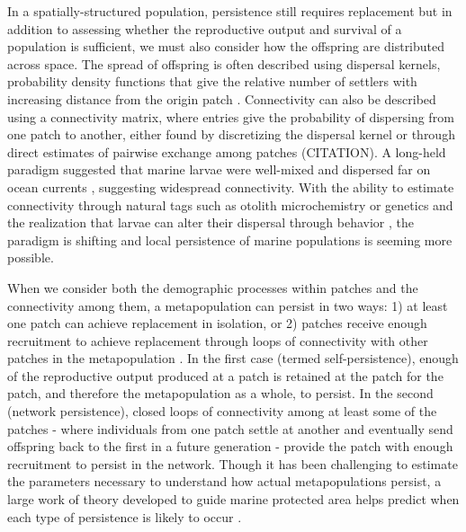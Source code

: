 \documentclass[12pt, oneside]{article}   	%
\begin{document}
In a spatially-structured population, persistence still requires replacement but in addition to assessing whether the reproductive output and survival of a population is sufficient, we must also consider how the offspring are distributed across space. The spread of offspring is often described using dispersal kernels, probability density functions that give the relative number of settlers with increasing distance from the origin patch \citep[e.g.][]{bode2018estimating}. Connectivity can also be described using a connectivity matrix, where entries give the probability of dispersing from one patch to another, either found by discretizing the dispersal kernel or through direct estimates of pairwise exchange among patches (CITATION). A long-held paradigm suggested that marine larvae were well-mixed and dispersed far on ocean currents \citep{roughgarden_recruitment_1988}, suggesting widespread connectivity. With the ability to estimate connectivity through natural tags such as otolith microchemistry or genetics and the realization that larvae can alter their dispersal through behavior \citep[e.g.][]{morgan_nearshore_2009}, the paradigm is shifting and local persistence of marine populations is seeming more possible. %

When we consider both the demographic processes within patches and the connectivity among them, a metapopulation can persist in two ways: 1) at least one patch can achieve replacement in isolation, or 2) patches receive enough recruitment to achieve replacement through loops of connectivity with other patches in the metapopulation \citep{hastings_persistence_2006, burgess2014beyond}. In the first case (termed self-persistence), enough of the reproductive output produced at a patch is retained at the patch for the patch, and therefore the metapopulation as a whole, to persist. In the second (network persistence), closed loops of connectivity among at least some of the patches - where individuals from one patch settle at another and eventually send offspring back to the first in a future generation - provide the patch with enough recruitment to persist in the network. Though it has been challenging to estimate the parameters necessary to understand how actual metapopulations persist, a large work of theory developed to guide marine protected area helps predict when each type of persistence is likely to occur \citep[i.e.\ large patches relative to the mean dispersal distance are likely to be self-persistent][]{botsford_dependence_2001}. %
\end{document}
